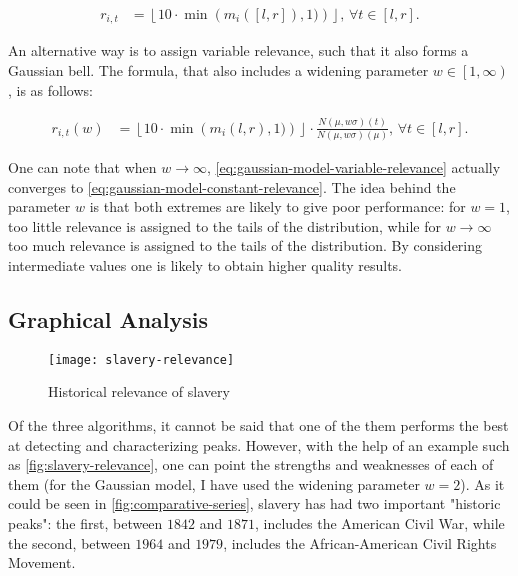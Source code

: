 \begin{align}
\label{eq:gaussian-model-constant-relevance}
r_{i, t} &= \left\lfloor 10 \cdot \min \left( m_i \left( \left[ l, r \right] \right), 1) \right) \right\rfloor, \, \forall t \in \left[ l, r \right].
\end{align}

An alternative way is to assign variable relevance, such that it also forms a Gaussian bell. The formula, that also includes a widening parameter $w \in \left[ 1, \infty \right)$, is as follows:

\begin{align}
\label{eq:gaussian-model-variable-relevance}
r_{i, t} \left( w \right) &= \left\lfloor 10 \cdot \min \left( m_i \left( l, r \right), 1) \right) \right\rfloor \cdot \frac{N \left( \mu, w \sigma \right) \left( t \right)}{N \left( \mu, w \sigma \right) \left( \mu \right)}, \, \forall t \in \left[ l, r \right].
\end{align}

One can note that when $w \to \infty$, \autoref{eq:gaussian-model-variable-relevance} actually converges to \autoref{eq:gaussian-model-constant-relevance}. The idea behind the parameter $w$ is that both extremes are likely to give poor performance: for $w = 1$, too little relevance is assigned to the tails of the distribution, while for $w \to \infty$ too much relevance is assigned to the tails of the distribution. By considering intermediate values one is likely to obtain higher quality results.

\subsection{Graphical Analysis}
\label{subsec:graphical-analysis}

\begin{figure}
\centering
\texttt{[image: slavery-relevance]}
\caption{Historical relevance of slavery}
\label{fig:slavery-relevance}
\end{figure}

Of the three algorithms, it cannot be said that one of the them performs the best at detecting and characterizing peaks. However, with the help of an example such as \autoref{fig:slavery-relevance}, one can point the strengths and weaknesses of each of them (for the Gaussian model, I have used the widening parameter $w = 2$). As it could be seen in \autoref{fig:comparative-series}, slavery has had two important "historic peaks": the first, between $1842$ and $1871$, includes the American Civil War, while the second, between $1964$ and $1979$, includes the African-American Civil Rights Movement.

